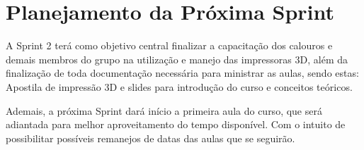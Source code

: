 \documentclass [12 pt ,a4 paper]{article}
\begin{document}
\section {Planejamento da Próxima Sprint}

A Sprint 2 terá como objetivo central finalizar a capacitação dos calouros e demais membros do grupo na utilização e manejo das impressoras 3D, além da finalização de toda documentação necessária para ministrar as aulas, sendo estas: Apostila de impressão 3D e slides para introdução do curso e conceitos teóricos.

Ademais, a próxima Sprint dará início a primeira aula do curso, que será adiantada para melhor aproveitamento do tempo disponível. Com o intuito de possibilitar possíveis remanejos de datas das aulas que se seguirão.
\end{document}
